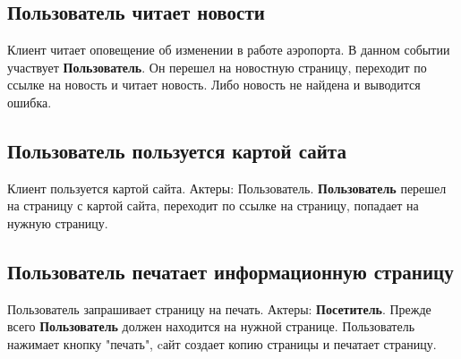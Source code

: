 \subsection{Пользователь читает новости}
Клиент читает оповещение об изменении в работе аэропорта.
В данном событии участвует \textbf{Пользователь}.
Он перешел на новостную страницу, переходит по ссылке на
новость и читает новость. Либо новость не найдена и
выводится ошибка.

\subsection{Пользователь пользуется картой сайта}
Клиент пользуется картой сайта. Актеры: Пользователь.
\textbf{Пользователь} перешел на страницу с картой сайта,
переходит по ссылке на страницу, попадает на нужную страницу.

\subsection{Пользователь печатает информационную страницу}
Пользователь запрашивает страницу на печать. Актеры:
\textbf{Посетитель}. Прежде всего \textbf{Пользователь}
должен находится на нужной странице. Пользователь нажимает
кнопку "печать", cайт создает копию страницы и печатает
страницу.
